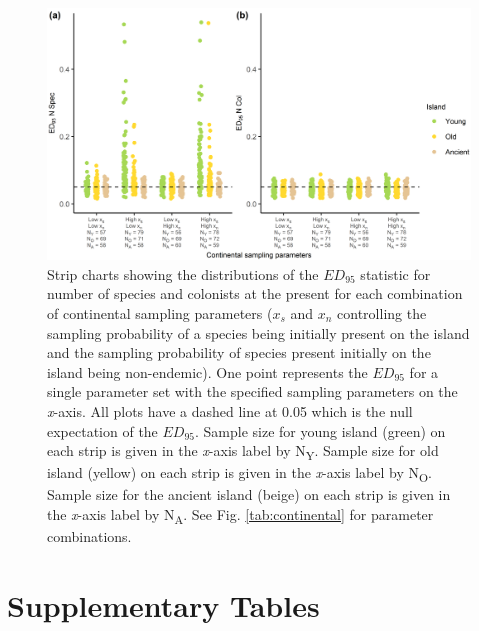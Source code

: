 \begin{figure}
    \centering
    \includegraphics{continental_spec_col_facet_.png}
    \caption{Strip charts showing the distributions of the $ED_{95}$ statistic for number of species and colonists at the present for each combination of continental sampling parameters ($x_s$ and $x_n$ controlling the sampling probability of a species being initially present on the island and the sampling probability of species present initially on the island being non-endemic). One point represents the $ED_{95}$ for a single parameter set with the specified sampling parameters on the \textit{x}-axis. All plots have a dashed line at 0.05 which is the null expectation of the $ED_{95}$. Sample size for young island (green) on each strip is given in the \textit{x}-axis label by N\textsubscript{Y}. Sample size for old island (yellow) on each strip is given in the \textit{x}-axis label by N\textsubscript{O}. Sample size for the ancient island (beige) on each strip is given in the \textit{x}-axis label by N\textsubscript{A}. See Fig. \ref{tab:continental} for parameter combinations.}
    \label{fig:continental_spec_col_facet_}
\end{figure}

\clearpage

\section*{Supplementary Tables}

